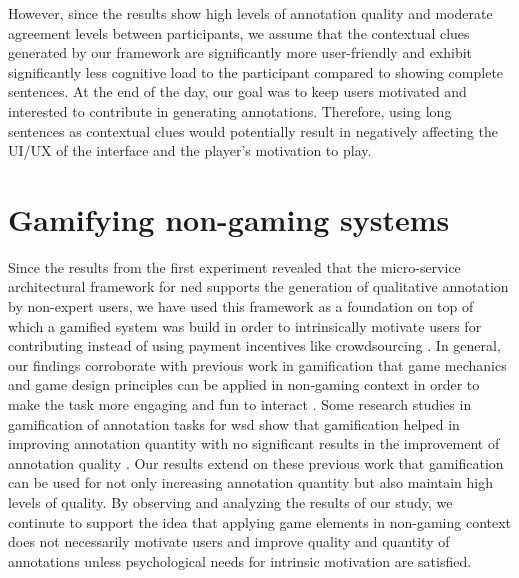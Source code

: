 \if However, since the results show high levels of annotation quality and moderate agreement levels between participants, we assume that the contextual clues generated by our framework are significantly more user-friendly and exhibit significantly less cognitive load to the participant compared to showing complete sentences. At the end of the day, our goal was to keep users motivated and interested to contribute in generating annotations. Therefore, using long sentences as contextual clues would potentially result in negatively affecting the UI/UX of the interface and the player's motivation to play. \fi

\section{Gamifying non-gaming systems}
Since the results from the first experiment revealed that the micro-service architectural framework for \ac{ned} supports the generation of qualitative annotation by non-expert users, we have used this framework as a foundation on top of which a gamified system was build in order to intrinsically motivate users for contributing instead of using payment incentives like crowdsourcing \cite{9,32,33}. In general, our findings corroborate with previous work in gamification that game mechanics and game design principles can be applied in non-gaming context in order to make the task more engaging and fun to interact \cite{44,45,50}. Some research studies in gamification of annotation tasks for \ac{wsd} show that gamification helped in improving annotation quantity with no significant results in the improvement of annotation quality \cite{46}. Our results extend on these previous work that gamification can be used for not only increasing annotation quantity but also maintain high levels of quality. By observing and analyzing the results of our study, we continute to support the idea that applying game elements in non-gaming context does not necessarily motivate users and improve quality and quantity of annotations unless psychological needs for intrinsic motivation are satisfied.

